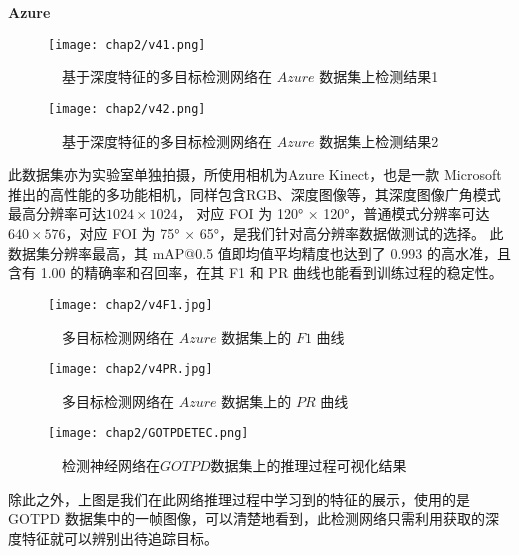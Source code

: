 \\ \hspace*{\fill} \\
\textbf{Azure}

\begin{figure}[htbp]
	\centering
	\begin{minipage}{0.48\linewidth}
		\centering
		\texttt{[image: chap2/v41.png]}
		\caption{\ \ 基于深度特征的多目标检测网络在 $Azure$ 数据集上检测结果1}
		\label{fig2-22}%
	\end{minipage}
	\begin{minipage}{0.48\linewidth}
		\centering
		\texttt{[image: chap2/v42.png]}
		\caption{\ \ 基于深度特征的多目标检测网络在 $Azure$ 数据集上检测结果2}
		\label{fig2-23}%
	\end{minipage}
\end{figure}

此数据集亦为实验室单独拍摄，所使用相机为Azure Kinect，也是一款 Microsoft 推出的高性能的多功能相机，同样包含RGB、深度图像等，其深度图像广角模式最高分辨率可达$1024\times 1024$，
对应 FOI 为 120° × 120°，普通模式分辨率可达$640\times 576$，对应 FOI 为 75° × 65°，是我们针对高分辨率数据做测试的选择。
此数据集分辨率最高，其 mAP@0.5 值即均值平均精度也达到了 0.993 的高水准，且含有 1.00 的精确率和召回率，在其 F1 和 PR 曲线也能看到训练过程的稳定性。
\begin{figure}[htbp]
	\begin{minipage}{0.48\linewidth}
		\centering
		\texttt{[image: chap2/v4F1.jpg]}
		\caption{\ \ 多目标检测网络在 $Azure$ 数据集上的 $F1$ 曲线}
		\label{fig2-24}%
	\end{minipage}
	\begin{minipage}{0.48\linewidth}
		\centering
		\texttt{[image: chap2/v4PR.jpg]}
		\caption{\ \ 多目标检测网络在 $Azure$ 数据集上的 $PR$ 曲线}
		\label{fig2-25}%
	\end{minipage}
\end{figure}

\vspace{6mm}
\begin{figure}[h]
	\centering
	\texttt{[image: chap2/GOTPDETEC.png]}
	\caption{\ \ 检测神经网络在$GOTPD$数据集上的推理过程可视化结果}
	\label{fig2-26}
\end{figure}
\vspace{3mm}

除此之外，上图是我们在此网络推理过程中学习到的特征的展示，使用的是 GOTPD 数据集中的一帧图像，可以清楚地看到，此检测网络只需利用获取的深度特征就可以辨别出待追踪目标。

